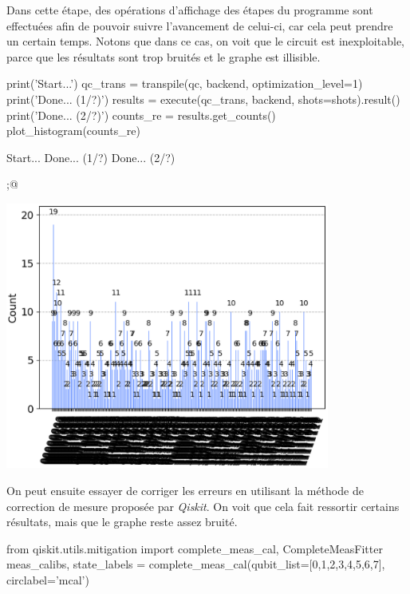 Dans cette étape, des opérations d'affichage des étapes du programme sont effectuées afin de pouvoir
suivre l'avancement de celui-ci, car cela peut prendre un certain temps.
Notons que dans ce cas, on voit que le circuit est inexploitable, parce que les résultats sont trop bruités
et le graphe est illisible.\\

\begin{pyin}
print('Start...')
qc_trans = transpile(qc, backend, optimization_level=1)
print('Done... (1/?)')
results = execute(qc_trans, backend, shots=shots).result()
print('Done... (2/?)')
counts_re = results.get_counts()
plot_histogram(counts_re)
\end{pyin}

\begin{pyprint}
Start...
Done... (1/?)
Done... (2/?)
\end{pyprint}

\begin{pyout}
;@ \begin{center}\includegraphics[width=0.8\textwidth]{images/appendix/out10.eps}\end{center}
\end{pyout}

On peut ensuite essayer de corriger les erreurs en utilisant la méthode de correction de mesure
proposée par \emph{Qiskit}.
On voit que cela fait ressortir certains résultats, mais que le graphe reste assez bruité.\\

\begin{pyin}
from qiskit.utils.mitigation import complete_meas_cal, CompleteMeasFitter
meas_calibs, state_labels = complete_meas_cal(qubit_list=[0,1,2,3,4,5,6,7], circlabel='mcal')
\end{pyin}

